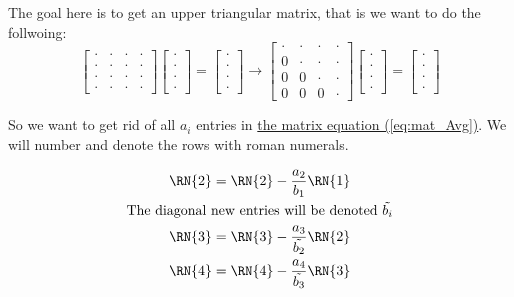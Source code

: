 \documentclass[english,notitlepage]{article}  %
\begin{document}
    The goal here is to get an upper triangular matrix, that is we want to do the follwoing:
    \begin{equation*}
        \begin{bmatrix}
            \cdot & \cdot & \cdot & \cdot \\
            \cdot & \cdot & \cdot & \cdot \\
            \cdot & \cdot & \cdot & \cdot \\
            \cdot & \cdot & \cdot & \cdot
        \end{bmatrix} \begin{bmatrix}
            \cdot\\
            \cdot\\
            \cdot\\
            \cdot
        \end{bmatrix} = \begin{bmatrix}
            \cdot\\
            \cdot\\
            \cdot\\
            \cdot
        \end{bmatrix}
        \rightarrow
        \begin{bmatrix}
            \cdot & \cdot & \cdot & \cdot \\
            0 & \cdot & \cdot & \cdot \\
            0 & 0 & \cdot & \cdot \\
            0 & 0 & 0 & \cdot
        \end{bmatrix} \begin{bmatrix}
            \cdot\\
            \cdot\\
            \cdot\\
            \cdot
        \end{bmatrix} = \begin{bmatrix}
            \cdot\\
            \cdot\\
            \cdot\\
            \cdot
        \end{bmatrix}
    \end{equation*}

    So we want to get rid of all $a_i$ entries in \hyperref[eq:mat_Avg]{the matrix equation (\ref*{eq:mat_Avg})}. We will number and denote the rows with roman numerals.

    \begin{gather}
        \RN{2} = \RN{2} - \frac{a_2}{b_1}\RN{1}\\
        \text{The diagonal new entries will be denoted } \tilde{b_i} \nonumber \\
        \RN{3} = \RN{3} - \frac{a_3}{\tilde{b_2}}\RN{2}\\
        \RN{4} = \RN{4} - \frac{a_4}{\tilde{b_3}}\RN{3}\\
    \end{gather}
\end{document}

